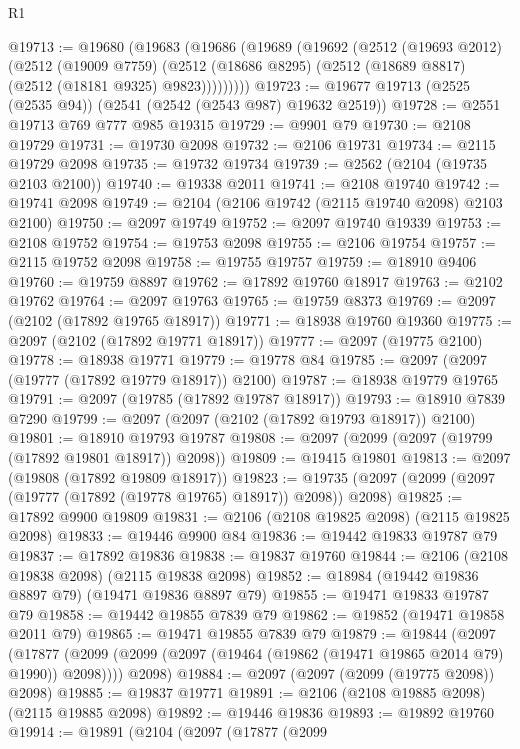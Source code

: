 \begin{lexlean}{R1}
\begin{coremodule}
@19713 := @19680
    (@19683
      (@19686
        (@19689
          (@19692
            (@2512
              (@19693 @2012)
              (@2512
                (@19009 @7759)
                (@2512 (@18686 @8295) (@2512 (@18689 @8817) (@2512 (@18181 @9325) @9823)))))))))
@19723 := @19677 @19713 (@2525 (@2535 @94)) (@2541 (@2542 (@2543 @987) @19632 @2519))
@19728 := @2551 @19713 @769 @777 @985 @19315
@19729 := @9901 @79
@19730 := @2108 @19729
@19731 := @19730 @2098
@19732 := @2106 @19731
@19734 := @2115 @19729 @2098
@19735 := @19732 @19734
@19739 := @2562 (@2104 (@19735 @2103 @2100))
@19740 := @19338 @2011
@19741 := @2108 @19740
@19742 := @19741 @2098
@19749 := @2104 (@2106 @19742 (@2115 @19740 @2098) @2103 @2100)
@19750 := @2097 @19749
@19752 := @2097 @19740 @19339
@19753 := @2108 @19752
@19754 := @19753 @2098
@19755 := @2106 @19754
@19757 := @2115 @19752 @2098
@19758 := @19755 @19757
@19759 := @18910 @9406
@19760 := @19759 @8897
@19762 := @17892 @19760 @18917
@19763 := @2102 @19762
@19764 := @2097 @19763
@19765 := @19759 @8373
@19769 := @2097 (@2102 (@17892 @19765 @18917))
@19771 := @18938 @19760 @19360
@19775 := @2097 (@2102 (@17892 @19771 @18917))
@19777 := @2097 (@19775 @2100)
@19778 := @18938 @19771
@19779 := @19778 @84
@19785 := @2097 (@2097 (@19777 (@17892 @19779 @18917)) @2100)
@19787 := @18938 @19779 @19765
@19791 := @2097 (@19785 (@17892 @19787 @18917))
@19793 := @18910 @7839 @7290
@19799 := @2097 (@2097 (@2102 (@17892 @19793 @18917)) @2100)
@19801 := @18910 @19793 @19787
@19808 := @2097 (@2099 (@2097 (@19799 (@17892 @19801 @18917)) @2098))
@19809 := @19415 @19801
@19813 := @2097 (@19808 (@17892 @19809 @18917))
@19823 := @19735 (@2097 (@2099 (@2097 (@19777 (@17892 (@19778 @19765) @18917)) @2098)) @2098)
@19825 := @17892 @9900 @19809
@19831 := @2106 (@2108 @19825 @2098) (@2115 @19825 @2098)
@19833 := @19446 @9900 @84
@19836 := @19442 @19833 @19787 @79
@19837 := @17892 @19836
@19838 := @19837 @19760
@19844 := @2106 (@2108 @19838 @2098) (@2115 @19838 @2098)
@19852 := @18984 (@19442 @19836 @8897 @79) (@19471 @19836 @8897 @79)
@19855 := @19471 @19833 @19787 @79
@19858 := @19442 @19855 @7839 @79
@19862 := @19852 (@19471 @19858 @2011 @79)
@19865 := @19471 @19855 @7839 @79
@19879 := @19844
    (@2097
      (@17877 (@2099 (@2099 (@2097 (@19464 (@19862 (@19471 @19865 @2014 @79) @1990)) @2098))))
      @2098)
@19884 := @2097 (@2097 (@2099 (@19775 @2098)) @2098)
@19885 := @19837 @19771
@19891 := @2106 (@2108 @19885 @2098) (@2115 @19885 @2098)
@19892 := @19446 @19836
@19893 := @19892 @19760
@19914 := @19891
    (@2104
      (@2097
        (@17877
          (@2099

\end{coremodule}
\end{lexlean}
